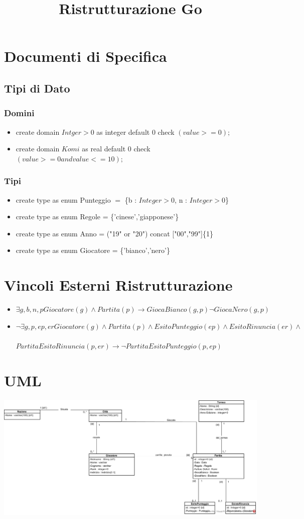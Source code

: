 \documentclass[12pt, letterpaper]{article}
\title{Ristrutturazione Go}
\date{}
\newcommand{\acc}{\\\hphantom{}\\}
\begin{document}
\maketitle


\section{Documenti di Specifica}
\subsection{Tipi di Dato}
\subsubsection{Domini}
\begin{itemize}
    \item create domain $Intger>0$ as integer
    default 0
    check $(value>=0);$
    \item create domain $Komi$ as real
    default 0
    check $(value>=0 and value <=10);$

\end{itemize}
\subsubsection{Tipi}
\begin{itemize}
    \item create type as enum Punteggio $=$ \{b : $Integer>0$, n : $Integer>0$\}
    \item create type as enum Regole = \{'cinese','giapponese'\}
    \item create type as enum Anno = ("19" or "20") concat ["00","99"]\{1\}
    \item create type as enum Giocatore = \{'bianco','nero'\}
\end{itemize}
\section{Vincoli Esterni Ristrutturazione}
\begin{itemize}
    \item $\exists g,b,n,p  Giocatore(g) \land Partita(p) \rightarrow GiocaBianco(g,p) \lnot GiocaNero(g,p)$
    \item $\lnot \exists g,p,ep, er Giocatore(g) \land Partita(p) \land EsitoPunteggio(ep) \land EsitoRinuncia(er) \land$\acc
    $ PartitaEsitoRinuncia(p,er)\rightarrow \lnot PartitaEsitoPunteggio(p,ep)$
\end{itemize}


\section{UML}
\begin{center}
    \includegraphics[width=\textwidth]{UML.jpg}
\end{center}
\end{document}
